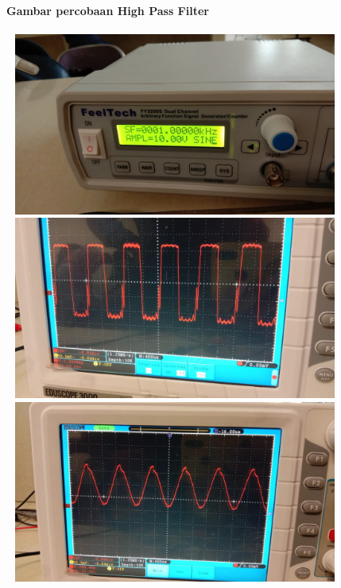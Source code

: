 \documentclass[12pt,a4paper]{article}
\begin{document}
\newpage
\begin{figure}
\paragraph{Gambar percobaan High Pass Filter}
\paragraph{ }
\begin{center}

\includegraphics[width=12cm, height=6cm]{HPF3.png}

\includegraphics[width=12cm, height=6cm]{HPF4.png}

\includegraphics[width=12cm, height=6cm]{HPF5.png}

\end{center}
\end{figure}
\vspace{2cm}
\end{document}
